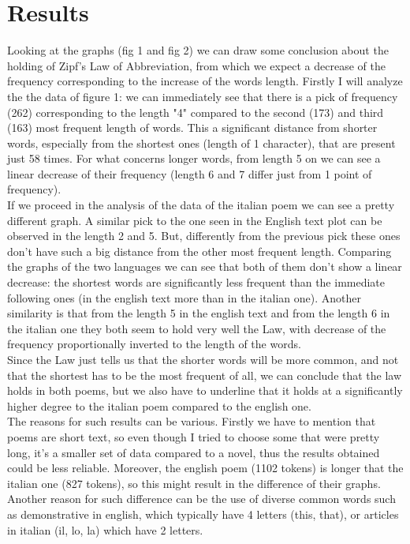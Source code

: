 \section{Results}
Looking at the graphs (fig 1 and fig 2) we can draw some conclusion about the holding of Zipf's Law of Abbreviation, from which we expect a decrease of the frequency corresponding to the increase of the words length.
Firstly I will analyze the the data of figure 1: we can immediately see that there is a pick of frequency (262) corresponding to the length "4" compared to the second (173) and third (163) most frequent length of words. 
This a significant distance from shorter words, especially from the shortest ones (length of 1 character), that are present just 58 times.
For what concerns longer words, from length 5 on we can see a linear decrease of their frequency (length 6 and 7 differ just from 1 point of frequency).\\
If we proceed in the analysis of the data of the italian poem we can see a pretty different graph. 
A similar pick to the one seen in the English text plot can be observed in the length 2 and 5.
But, differently from the previous pick these ones don't have such a big distance from the other most frequent length. 
Comparing the graphs of the two languages we can see that both of them don't show a linear decrease: the shortest words are significantly less frequent than the immediate following ones (in the english text more than in the italian one). 
Another similarity is that from the length 5 in the english text and from the length 6 in the italian one they both seem to hold very well the Law, with decrease of the frequency proportionally inverted to the length of the words.\\
Since the Law just tells us that the shorter words will be more common, and not that the shortest has to be the most frequent of all, we can conclude that the law holds in both poems, but we also have to underline that it holds at a significantly higher degree to the italian poem compared to the english one.\\
The reasons for such results can be various. Firstly we have to mention that poems are short text, so even though I tried to choose some that were pretty long, it's a smaller set of data compared to a novel, thus the results obtained could be less reliable.
Moreover, the english poem (1102 tokens) is longer that the italian one (827 tokens), so this might result in the difference of their graphs.
Another reason for such difference can be the use of diverse common words such as demonstrative in english, which typically have 4 letters (this, that), or articles in italian (il, lo, la) which have 2 letters. \\
